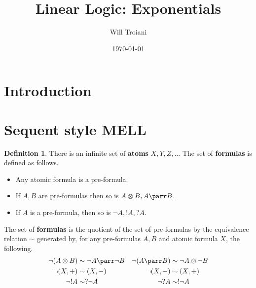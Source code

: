 \documentclass[12pt]{article}
\title{Linear Logic: Exponentials}
\author{Will Troiani}
\date{\today}
\theoremstyle{plain}
\theoremstyle{definition}
\newtheorem{defn}[thm]{Definition} %
\begin{document}
	\maketitle
	
	\section{Introduction}
	
	\section{Sequent style MELL}
	\begin{defn}
		There is an infinite set of \textbf{atoms} $X, Y, Z, \ldots$ The set of \textbf{formulas} is defined as follows.
		\begin{itemize}
			\item Any atomic formula is a pre-formula.
			\item If $A,B$ are pre-formulas then so is $A \otimes B, A \parr B$.
			\item If $A$ is a pre-formula, then so is $\neg A, ! A, ?A$.
		\end{itemize}
		The set of \textbf{formulas} is the quotient of the set of pre-formulas by the equivalence relation $\sim$ generated by, for any pre-formulas $A,B$ and atomic formula $X$, the following.
		\begin{align*}
			\neg(A \otimes B) &\sim \neg A \parr \neg B & \neg(A \parr B) &\sim \neg A \otimes \neg B\\
			\neg (X,+) &\sim (X,-) & \neg (X,-) &\sim (X,+)\\
			\neg !A &\sim ? \neg A & \neg ? A &\sim ! \neg A
		\end{align*}
	\end{defn}
	
\end{document}
